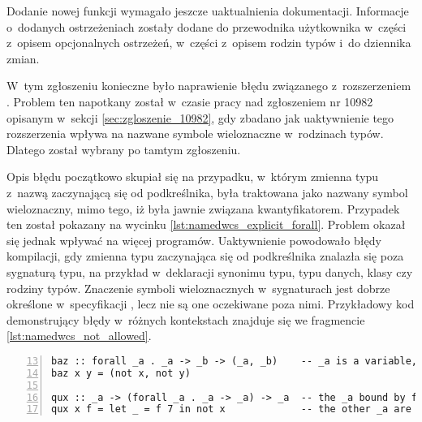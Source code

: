 Dodanie nowej funkcji wymagało jeszcze uaktualnienia dokumentacji. Informacje
o~dodanych ostrzeżeniach zostały dodane do przewodnika użytkownika w~części
z~opisem opcjonalnych ostrzeżeń, w~części z~opisem rodzin typów i~do dziennika
zmian.


\label{sec:zgloszenie_11098}

W~tym zgłoszeniu konieczne było naprawienie błędu związanego z~rozszerzeniem
. Problem ten napotkany został w~czasie pracy nad
zgłoszeniem nr 10982 opisanym w~sekcji \ref{sec:zgloszenie_10982}, gdy zbadano
jak uaktywnienie tego rozszerzenia wpływa na nazwane symbole wieloznaczne
w~rodzinach typów. Dlatego został wybrany po tamtym zgłoszeniu.

Opis błędu początkowo skupiał się na przypadku, w~którym zmienna typu z~nazwą
zaczynającą się od podkreślnika, była traktowana jako nazwany symbol wieloznaczny,
mimo tego, iż była jawnie związana kwantyfikatorem. Przypadek ten został pokazany na
wycinku \ref{lst:namedwcs_explicit_forall}. Problem okazał się jednak wpływać na
więcej programów. Uaktywnienie  powodowało błędy
kompilacji, gdy zmienna typu zaczynająca się od podkreślnika znalazła się poza
sygnaturą typu, na przykład w~deklaracji synonimu typu, typu danych, klasy czy
rodziny typów. Znaczenie symboli wieloznacznych w~sygnaturach jest dobrze
określone w~specyfikacji , lecz nie są one
oczekiwane poza nimi. Przykładowy kod demonstrujący błędy w~różnych kontekstach
znajduje się we fragmencie \ref{lst:namedwcs_not_allowed}.

\begin{lstlisting}[float,numbers=left,firstnumber=13,label={lst:namedwcs_explicit_forall},
                   caption={Fragment testu \code{NamedWildcardExplicitForall} sprawdzającego, czy zmienne związane kwantyfikatorem nie zostają zamienione w wieloznaczniki.}]
baz :: forall _a . _a -> _b -> (_a, _b)    -- _a is a variable, _b is a wildcard
baz x y = (not x, not y)

qux :: _a -> (forall _a . _a -> _a) -> _a  -- the _a bound by forall is a tyvar
qux x f = let _ = f 7 in not x             -- the other _a are wildcards
\end{lstlisting}

